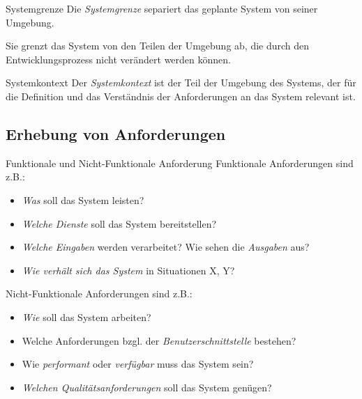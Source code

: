 \begin{defi}{Systemgrenze}
    Die \emph{Systemgrenze} separiert das geplante System von seiner Umgebung.

    Sie grenzt das System von den Teilen der Umgebung ab, die durch den Entwicklungsprozess nicht verändert werden können.
\end{defi}

\begin{defi}{Systemkontext}
    Der \emph{Systemkontext} ist der Teil der Umgebung des Systems, der für die Definition und das Verständnis der Anforderungen an das System relevant ist.
\end{defi}

\subsection{Erhebung von Anforderungen}

\begin{defi}{Funktionale und Nicht-Funktionale Anforderung}
    Funktionale Anforderungen sind z.B.:
    \begin{itemize}
        \item \emph{Was} soll das System leisten?
        \item \emph{Welche Dienste} soll das System bereitstellen?
        \item \emph{Welche Eingaben} werden verarbeitet? Wie sehen die \emph{Ausgaben} aus?
        \item \emph{Wie verhält sich das System} in Situationen X, Y?
    \end{itemize}

    Nicht-Funktionale Anforderungen sind z.B.:
    \begin{itemize}
        \item \emph{Wie} soll das System arbeiten?
        \item Welche Anforderungen bzgl. der \emph{Benutzerschnittstelle} bestehen?
        \item Wie \emph{performant} oder \emph{verfügbar} muss das System sein?
        \item \emph{Welchen Qualitätsanforderungen} soll das System genügen?
    \end{itemize}
\end{defi}

